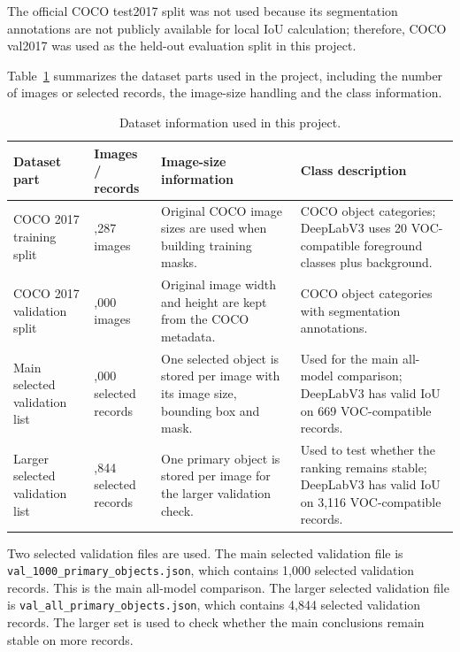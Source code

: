 \documentclass[9pt,a4paper,oneside]{rho-class/rho}
\begin{document}
    The official COCO test2017 split was not used because its segmentation annotations are not publicly available for local IoU calculation; therefore, COCO val2017 was used as the held-out evaluation split in this project.

    Table~\ref{tab:dataset-summary} summarizes the dataset parts used in the project, including the number of images or selected records, the image-size handling and the class information.

\begin{table}[H]
    \centering
    \caption{Dataset information used in this project.}
    \label{tab:dataset-summary}
    \footnotesize
    \renewcommand{\arraystretch}{1.15}
    \begin{tabular}{>{\raggedright\arraybackslash}p{}>{\raggedright\arraybackslash}p{}>{\raggedright\arraybackslash}p{}>{\raggedright\arraybackslash}p{}}
        \hline
        \textbf{Dataset part} & \textbf{Images / records} & \textbf{Image-size information} & \textbf{Class description} \\
        \hline
        COCO 2017 training split & 118,287 images & Original COCO image sizes are used when building training masks. & 80 COCO object categories; DeepLabV3 uses 20 VOC-compatible foreground classes plus background. \\
        COCO 2017 validation split & 5,000 images & Original image width and height are kept from the COCO metadata. & 80 COCO object categories with segmentation annotations. \\
        Main selected validation list & 1,000 selected records & One selected object is stored per image with its image size, bounding box and mask. & Used for the main all-model comparison; DeepLabV3 has valid IoU on 669 VOC-compatible records. \\
        Larger selected validation list & 4,844 selected records & One primary object is stored per image for the larger validation check. & Used to test whether the ranking remains stable; DeepLabV3 has valid IoU on 3,116 VOC-compatible records. \\
        \hline
    \end{tabular}%
\end{table}

    Two selected validation files are used. The main selected validation file is \texttt{val\_1000\_primary\_objects.json}, which contains 1,000 selected validation records. This is the main all-model comparison. The larger selected validation file is \texttt{val\_all\_primary\_objects.json}, which contains 4,844 selected validation records. The larger set is used to check whether the main conclusions remain stable on more records.
\end{document}
